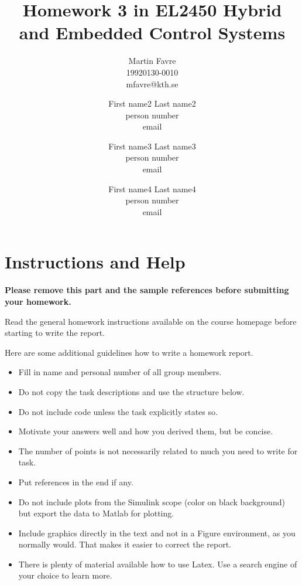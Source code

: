 \documentclass[a4paper,12pt,oneside,onecolumn]{article} %
\begin{document}

\title{Homework 3 in EL2450 Hybrid and Embedded Control Systems}
\author{
  Martin Favre \\ 19920130-0010 \\ mfavre@kth.se 
  \and 
  First name2 Last name2 \\ person number \\ email
  \and
  First name3 Last name3 \\ person number \\ email
  \and
  First name4 Last name4 \\ person number \\ email
  \and
  }

\maketitle                     %





\section*{Instructions and Help}

\textbf{Please remove this part and the sample references before submitting your homework.}

Read the general homework instructions available on the course homepage before starting to write the report.

Here are some additional guidelines how to write a homework report.
\begin{itemize}
 \item Fill in name and personal number of all group members.
 \item Do not copy the task descriptions and use the structure below.
 \item Do not include code unless the task explicitly states so.
 \item Motivate your answers well and how you derived them, but be concise.
 \item The number of points is not necessarily related to much you need to write for task.
 \item Put references in the end if any.
 \item Do not include plots from the Simulink scope (color on black background) but export the data to Matlab for plotting.
 \item Include graphics directly in the text and not in a Figure environment, as you normally would. That makes it easier to correct the report.
 \item There is plenty of material available how to use Latex. Use a search engine of your choice to learn more.
\end{itemize}
\end{document}
